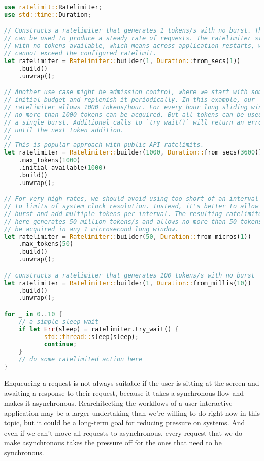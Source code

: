 \begin{lstlisting}[language=Rust]
use ratelimit::Ratelimiter;
use std::time::Duration;

// Constructs a ratelimiter that generates 1 tokens/s with no burst. This
// can be used to produce a steady rate of requests. The ratelimiter starts
// with no tokens available, which means across application restarts, we
// cannot exceed the configured ratelimit.
let ratelimiter = Ratelimiter::builder(1, Duration::from_secs(1))
    .build()
    .unwrap();

// Another use case might be admission control, where we start with some
// initial budget and replenish it periodically. In this example, our
// ratelimiter allows 1000 tokens/hour. For every hour long sliding window,
// no more than 1000 tokens can be acquired. But all tokens can be used in
// a single burst. Additional calls to `try_wait()` will return an error
// until the next token addition.
//
// This is popular approach with public API ratelimits.
let ratelimiter = Ratelimiter::builder(1000, Duration::from_secs(3600))
    .max_tokens(1000)
    .initial_available(1000)
    .build()
    .unwrap();

// For very high rates, we should avoid using too short of an interval due
// to limits of system clock resolution. Instead, it's better to allow some
// burst and add multiple tokens per interval. The resulting ratelimiter
// here generates 50 million tokens/s and allows no more than 50 tokens to
// be acquired in any 1 microsecond long window.
let ratelimiter = Ratelimiter::builder(50, Duration::from_micros(1))
    .max_tokens(50)
    .build()
    .unwrap();

// constructs a ratelimiter that generates 100 tokens/s with no burst
let ratelimiter = Ratelimiter::builder(1, Duration::from_millis(10))
    .build()
    .unwrap();

for _ in 0..10 {
    // a simple sleep-wait
    if let Err(sleep) = ratelimiter.try_wait() {
           std::thread::sleep(sleep);
           continue;
    }
    // do some ratelimited action here    
}
\end{lstlisting}

Enqueueing a request is not always suitable if the user is sitting at the screen and awaiting a response to their request, because it takes a synchronous flow and makes it asynchronous. Rearchitecting the workflows of a user-interactive application may be a larger undertaking than we're willing to do right now in this topic, but it could be a long-term goal for reducing pressure on systems. And even if we can't move all requests to asynchronous, every request that we do make asynchronous takes the pressure off for the ones that need to be synchronous.


